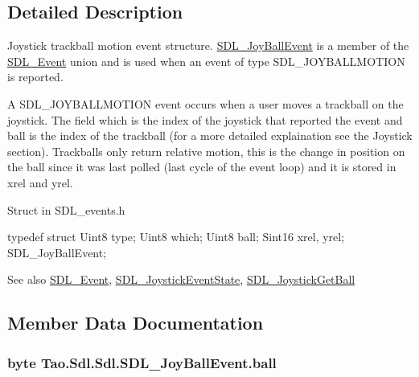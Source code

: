 \subsection{Detailed Description}
Joystick trackball motion event structure. \hyperlink{struct_tao_1_1_sdl_1_1_sdl_1_1_s_d_l___joy_ball_event}{SDL\_\-JoyBallEvent} is a member of the \hyperlink{struct_tao_1_1_sdl_1_1_s_d_l___event}{SDL\_\-Event} union and is used when an event of type SDL\_\-JOYBALLMOTION is reported. 

A SDL\_\-JOYBALLMOTION event occurs when a user moves a trackball on the joystick. The field which is the index of the joystick that reported the event and ball is the index of the trackball (for a more detailed explaination see the Joystick section). Trackballs only return relative motion, this is the change in position on the ball since it was last polled (last cycle of the event loop) and it is stored in xrel and yrel. 

Struct in SDL\_\-events.h 
\begin{DoxyCode}
            typedef struct{
                        Uint8 type;
                        Uint8 which;
                        Uint8 ball;
                        Sint16 xrel, yrel;
                } SDL_JoyBallEvent;
\end{DoxyCode}
 \begin{DoxySeeAlso}{See also}
\hyperlink{struct_tao_1_1_sdl_1_1_s_d_l___event}{SDL\_\-Event}, \hyperlink{_sdl_8cs_a4b5786d792bade406949c738f0290eca}{SDL\_\-JoystickEventState}, \hyperlink{_sdl_8cs_ac507b201a80334bc2e9a62ba44d8534b}{SDL\_\-JoystickGetBall}


\end{DoxySeeAlso}


\subsection{Member Data Documentation}
\hypertarget{struct_tao_1_1_sdl_1_1_sdl_1_1_s_d_l___joy_ball_event_ae04564d94976afbed00b8f63f7cc4b76}{
\subsubsection[{ball}]{\setlength{\rightskip}{0pt plus 5cm}byte {\bf Tao.Sdl.Sdl.SDL\_\-JoyBallEvent.ball}}}
\label{struct_tao_1_1_sdl_1_1_sdl_1_1_s_d_l___joy_ball_event_ae04564d94976afbed00b8f63f7cc4b76}


